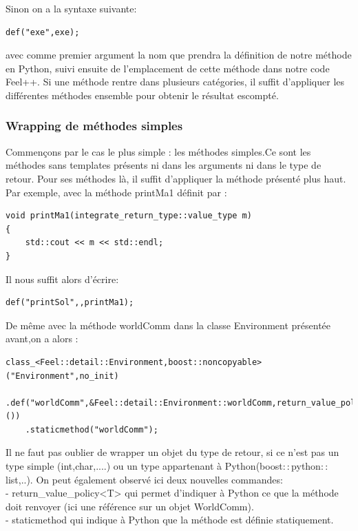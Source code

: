 \documentclass[french,12pt]{article}
\begin{document}
Sinon on a la syntaxe suivante:
\begin{lstlisting}
def("exe",exe);
\end{lstlisting}

avec comme premier argument la nom que prendra la définition de notre méthode en Python, suivi ensuite de l'emplacement de cette méthode dans notre code Feel++.
\newline
Si une méthode rentre dans plusieurs catégories, il suffit d'appliquer les différentes méthodes ensemble pour obtenir le résultat escompté.
\subsubsection{Wrapping de méthodes simples}

Commençons par le cas le plus simple : les méthodes simples.Ce sont les méthodes sans templates présents ni dans les arguments ni dans le type de retour.
Pour ses méthodes là, il suffit d'appliquer la méthode présenté plus haut.
Par exemple, avec la méthode printMa1 définit par :
\begin{lstlisting}
void printMa1(integrate_return_type::value_type m)
{
 	std::cout << m << std::endl;
}
\end{lstlisting}

Il nous suffit alors d'écrire:
\begin{lstlisting}
def("printSol",,printMa1);
\end{lstlisting}

De même avec la méthode worldComm dans la classe Environment présentée avant,on a alors :
\begin{lstlisting}
class_<Feel::detail::Environment,boost::noncopyable>("Environment",no_init)
	.def("worldComm",&Feel::detail::Environment::worldComm,return_value_policy<copy_non_const_reference>())
	.staticmethod("worldComm");
\end{lstlisting}

Il ne faut pas oublier de wrapper un objet du type de retour, si ce n'est pas un type simple (int,char,....) ou un type appartenant à Python(boost$::$python$::$list,..).
On peut également observé ici deux nouvelles commandes:\\
- return\_value\_policy<T> qui permet d'indiquer à Python ce que la méthode doit renvoyer (ici une référence sur un objet WorldComm).\\
- staticmethod qui indique à Python que la méthode est définie statiquement.\\
\end{document}
